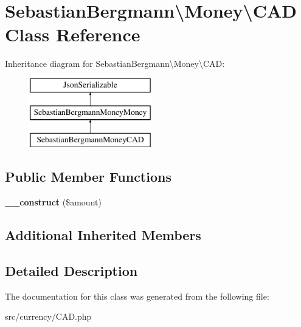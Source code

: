 \hypertarget{classSebastianBergmann_1_1Money_1_1CAD}{}\section{Sebastian\+Bergmann\textbackslash{}Money\textbackslash{}C\+A\+D Class Reference}
\label{classSebastianBergmann_1_1Money_1_1CAD}
Inheritance diagram for Sebastian\+Bergmann\textbackslash{}Money\textbackslash{}C\+A\+D\+:\begin{figure}[H]
\begin{center}
\leavevmode
\includegraphics[height=3.000000cm]{classSebastianBergmann_1_1Money_1_1CAD}
\end{center}
\end{figure}
\subsection*{Public Member Functions}
\begin{DoxyCompactItemize}
\item 
\hypertarget{classSebastianBergmann_1_1Money_1_1CAD_ae9d70e694f02e25f13533c7702eeb713}{}{\bfseries \+\_\+\+\_\+construct} (\$amount)\label{classSebastianBergmann_1_1Money_1_1CAD_ae9d70e694f02e25f13533c7702eeb713}

\end{DoxyCompactItemize}
\subsection*{Additional Inherited Members}


\subsection{Detailed Description}


The documentation for this class was generated from the following file\+:\begin{DoxyCompactItemize}
\item 
src/currency/C\+A\+D.\+php\end{DoxyCompactItemize}
